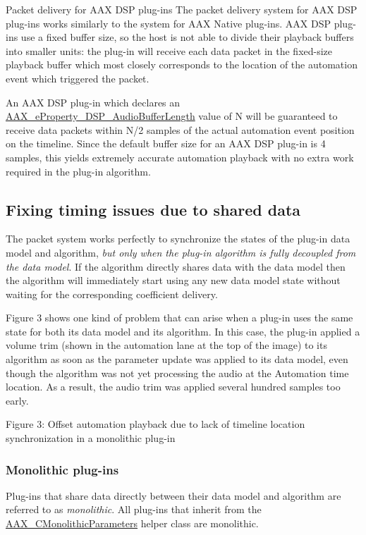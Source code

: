 \begin{DoxyParagraph}{Packet delivery for A\+A\+X D\+S\+P plug-\/ins}
The packet delivery system for A\+A\+X D\+S\+P plug-\/ins works similarly to the system for A\+A\+X Native plug-\/ins. A\+A\+X D\+S\+P plug-\/ins use a fixed buffer size, so the host is not able to divide their playback buffers into smaller units\+: the plug-\/in will receive each data packet in the fixed-\/size playback buffer which most closely corresponds to the location of the automation event which triggered the packet.

An A\+A\+X D\+S\+P plug-\/in which declares an \hyperlink{a00283_a6571f4e41a5dd06e4067249228e2249ea09fbd1cbcae0e86ad81005258dc1b67e}{A\+A\+X\+\_\+e\+Property\+\_\+\+D\+S\+P\+\_\+\+Audio\+Buffer\+Length} value of N will be guaranteed to receive data packets within N/2 samples of the actual automation event position on the timeline. Since the default buffer size for an A\+A\+X D\+S\+P plug-\/in is 4 samples, this yields extremely accurate automation playback with no extra work required in the plug-\/in algorithm. 
\end{DoxyParagraph}
\hypertarget{a00351_parameterUpdateTiming_sharedData}{}\subsection{Fixing timing issues due to shared data}\label{a00351_parameterUpdateTiming_sharedData}
The packet system works perfectly to synchronize the states of the plug-\/in data model and algorithm, {\itshape but only when the plug-\/in algorithm is fully decoupled from the data model}. If the algorithm directly shares data with the data model then the algorithm will immediately start using any new data model state without waiting for the corresponding coefficient delivery.

Figure 3 shows one kind of problem that can arise when a plug-\/in uses the same state for both its data model and its algorithm. In this case, the plug-\/in applied a volume trim (shown in the automation lane at the top of the image) to its algorithm as soon as the parameter update was applied to its data model, even though the algorithm was not yet processing the audio at the Automation time location. As a result, the audio trim was applied several hundred samples too early.

 Figure 3\+: Offset automation playback due to lack of timeline location synchronization in a monolithic plug-\/in\hypertarget{a00351_parameterUpdateTiming_monolithic}{}\subsubsection{Monolithic plug-\/ins}\label{a00351_parameterUpdateTiming_monolithic}
Plug-\/ins that share data directly between their data model and algorithm are referred to as {\itshape monolithic}. All plug-\/ins that inherit from the \hyperlink{a00026}{A\+A\+X\+\_\+\+C\+Monolithic\+Parameters} helper class are monolithic.


